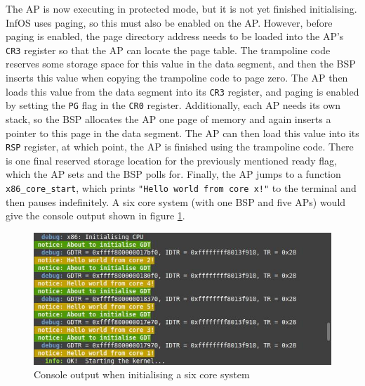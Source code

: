 \documentclass[bsc,frontabs,twoside,singlespacing,parskip,deptreport]{infthesis}     %
\begin{document}
The AP is now executing in protected mode, but it is not yet finished initialising. InfOS uses paging, so this must also be enabled on the AP. However, before paging is enabled, the page directory address needs to be loaded into the AP's \verb|CR3| register so that the AP can locate the page table. The trampoline code reserves some storage space for this value in the data segment, and then the BSP inserts this value when copying the trampoline code to page zero. The AP then loads this value from the data segment into its \verb|CR3| register, and paging is enabled by setting the \verb|PG| flag in the \verb|CR0| register. Additionally, each AP needs its own stack, so the BSP allocates the AP one page of memory and again inserts a pointer to this page in the data segment. The AP can then load this value into its \verb|RSP| register, at which point, the AP is finished using the trampoline code. There is one final reserved storage location for the previously mentioned ready flag, which the AP sets and the BSP polls for. Finally, the AP jumps to a function \verb|x86_core_start|, which prints \verb|"Hello world from core x!"| to the terminal and then pauses indefinitely. A six core system (with one BSP and five APs) would give the console output shown in figure \ref{hello-world}.

\begin{figure}[h]
    \centering
    \includegraphics[scale=0.6]{figures/hello-world.jpg}
    \caption{Console output when initialising a six core system}
    \label{hello-world}
\end{figure}
\end{document}
